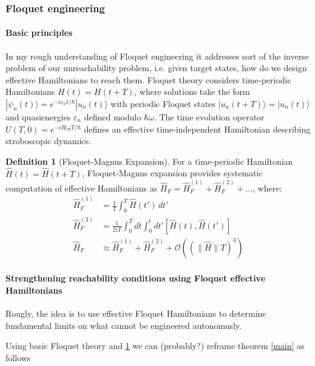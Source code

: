 \documentclass[ a4paper, 
                amsfonts, 
                amssymb, 
                amsmath, 
                reprint, 
                showkeys, 
                nofootinbib,
                superscriptaddress, 
                onecolumn, 
                notitlepage,
                aps,
                pra,
                longbibliography]{revtex4-1}
\theoremstyle{definition}
\newtheorem{definition}{Definition}[section]
\begin{document}
\subsubsection{Floquet engineering}

\paragraph{Basic principles}
In my rough understanding of Floquet engineering it addresses sort of the inverse problem of our unreachability problem, i.e. given target states, how do we design effective Hamiltonians to reach them.
Floquet theory considers time-periodic Hamiltonians $H(t) = H(t+T)$, where solutions take the form $|\psi_n(t)\rangle = e^{-i\varepsilon_n t/\hbar}|u_n(t)\rangle$ with periodic Floquet states $|u_n(t+T)\rangle = |u_n(t)\rangle$ and quasienergies $\varepsilon_n$ defined modulo $\hbar\omega$. The time evolution operator $U(T,0) = e^{-iH_{\text{eff}}T/\hbar}$ defines an effective time-independent Hamiltonian describing stroboscopic dynamics.

\begin{definition}[Floquet-Magnus Expansion]
\label{def:floqmag}
For a time-periodic Hamiltonian $\hat{H}(t) = \hat{H}(t+T)$, Floquet-Magnus expansion provides systematic computation of effective Hamiltonians as $\hat{H}_F  = \hat{H}_F^{(1)} + \hat{H}_F^{(2)} + \ldots$, where:
\begin{align}
\hat{H}_F^{(1)} &= \frac{1}{T}\int_0^T \hat{H}(t') \, dt'\\
\hat{H}_F^{(2)} &= \frac{1}{2iT}\int_0^T dt \int_0^t dt' \left[\hat{H}(t), \hat{H}(t')\right] \\
\hat{H}_F &\approx \hat{H}_F^{(1)} + \hat{H}_F^{(2)} + \mathcal{O}\left((\|\hat{H}\|T)^3\right)
\end{align}
\end{definition}

\paragraph{Strengthening reachability conditions using Floquet effective Hamiltonians}



    Rougly, the idea is to use effective Floquet Hamiltonians to determine fundamental limits on what cannot be engineered autonomusly. 


Using basic Floquet theory \cite{Goldman_2014} and \ref{def:floqmag} we can (probably?) reframe theorem \ref{main} as follows 
\end{document}
